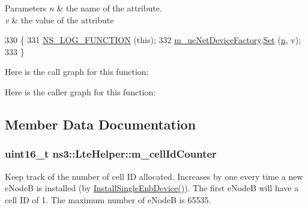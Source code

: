 \begin{DoxyParams}{Parameters}
{\em n} & the name of the attribute. \\
\hline
{\em v} & the value of the attribute \\
\hline
\end{DoxyParams}

\begin{DoxyCode}
330 \{
331   \hyperlink{log-macros-disabled_8h_a90b90d5bad1f39cb1b64923ea94c0761}{NS\_LOG\_FUNCTION} (\textcolor{keyword}{this});
332   \hyperlink{classns3_1_1LteHelper_acf4f709448cbc362c35b965782d00464}{m\_ueNetDeviceFactory}.\hyperlink{classns3_1_1ObjectFactory_aef5c0d5019c96bdf01cefd1ff83f4a68}{Set} (\hyperlink{namespacesample-rng-plot_aeb5ee5c431e338ef39b7ac5431242e1d}{n}, v);
333 \}
\end{DoxyCode}


Here is the call graph for this function\+:




Here is the caller graph for this function\+:




\subsection{Member Data Documentation}
\subsubsection[{\texorpdfstring{m\+\_\+cell\+Id\+Counter}{m_cellIdCounter}}]{\setlength{\rightskip}{0pt plus 5cm}uint16\+\_\+t ns3\+::\+Lte\+Helper\+::m\+\_\+cell\+Id\+Counter\hspace{0.3cm}{\ttfamily [private]}}\hypertarget{classns3_1_1LteHelper_a60f0f5feb3d9c6ac2e175f126c1ef4d4}{}\label{classns3_1_1LteHelper_a60f0f5feb3d9c6ac2e175f126c1ef4d4}
Keep track of the number of cell ID allocated. Increases by one every time a new e\+NodeB is installed (by \hyperlink{classns3_1_1LteHelper_afac168014c3a4ac5c30bfd7c1d09cb96}{Install\+Single\+Enb\+Device()}). The first e\+NodeB will have a cell ID of 1. The maximum number of e\+NodeB is 65535. 
